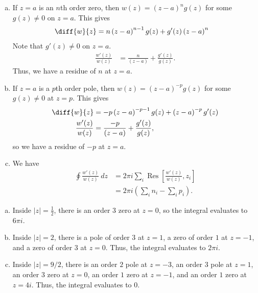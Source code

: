 \documentclass[10pt]{mypackage}
\DeclareMathOperator{\res}{Res}
\begin{document}
\begin{solution}[21.31]\hfill
  \begin{enumerate}[(a)]
    \item If $z = a$ is an $n$th order zero, then $w(z) = \left( z-a \right)^n g(z)$ for some $g(z)\neq 0$ on $z = a$. This gives
      \begin{align*}
        \diff{w}{z} &= n\left( z-a \right)^{n-1}g(z) + g'(z)\left( z-a \right)^n
      \end{align*}
      Note that $g'(z)\neq 0$ on $z = a$.
      \begin{align*}
        \frac{w'(z)}{w(z)} &= \frac{n}{\left( z-a \right)} + \frac{g'(z)}{g(z)}.
      \end{align*}
      Thus, we have a residue of $n$ at $z = a$.
    \item If $z= a$ is a $p$th order pole, then $w(z) = \left( z-a \right)^{-p}g(z)$ for some $g(z)\neq 0$ at $z = p$. This gives
      \begin{align*}
        \diff{w}{z} &= -p\left( z-a \right)^{-p-1}g(z) + \left( z-a \right)^{-p}g'(z)\\
        \frac{w'(z)}{w(z)} &= \frac{-p}{\left( z-a \right)} + \frac{g'(z)}{g(z)},
      \end{align*}
      so we have a residue of $-p$ at $z = a$.
    \item We have
      \begin{align*}
        \oint \frac{w'(z)}{w(z)}\:dz &= 2\pi i \sum_{i}\res\left[ \frac{w'(z)}{w(z)},z_i \right]\\
                                     &= 2\pi i \left( \sum_{i}n_i - \sum_{i}p_i \right).
      \end{align*}
  \end{enumerate}
\end{solution}
\begin{solution}[21.32]\hfill
  \begin{enumerate}[(a)]
    \item Inside $\left\vert z \right\vert = \frac{1}{2}$, there is an order $3$ zero at $z = 0$, so the integral evaluates to $6\pi i$.
    \item Inside $\left\vert z \right\vert = 2$, there is a pole of order $3$ at $z = 1$, a zero of order $1$ at $z = -1$, and a zero of order $3$ at $z = 0$. Thus, the integral evaluates to $2\pi i$.
    \item Inside $\left\vert z \right\vert = 9/2$, there is an order $2$ pole at $z  =-3$, an order $3$ pole at $z = 1$, an order $3$ zero at $z = 0$, an order $1$ zero at $z = -1$, and an order $1$ zero at $z = 4i$. Thus, the integral evaluates to $0$.
  \end{enumerate}
\end{solution}
\end{document}
